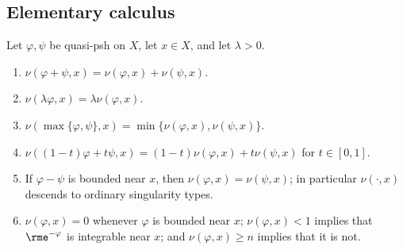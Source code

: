 \subsection{Elementary calculus}
\label{sec:ch51-lelong-calculus}

\begin{proposition}\label{prop:ch51-lelong-calculus}
Let $\varphi,\psi$ be quasi-psh on $X$, let $x\in X$, and let
$\lambda>0$.
\begin{enumerate}
\item\label{itm:ch51-lc:sum}
      $\nu(\varphi+\psi,x)=\nu(\varphi,x)+\nu(\psi,x)$.
\item\label{itm:ch51-lc:scale}
      $\nu(\lambda\varphi,x)=\lambda\nu(\varphi,x)$.
\item\label{itm:ch51-lc:max}
      $\nu(\max\{\varphi,\psi\},x)=\min\{\nu(\varphi,x),\nu(\psi,x)\}$.
\item\label{itm:ch51-lc:convex}
      $\nu((1-t)\varphi+t\psi,x)=(1-t)\nu(\varphi,x)+t\nu(\psi,x)$ for
      $t\in[0,1]$.
\item\label{itm:ch51-lc:bounded}
      If $\varphi-\psi$ is bounded near $x$, then
      $\nu(\varphi,x)=\nu(\psi,x)$; in particular $\nu(\cdot,x)$
      descends to ordinary singularity types.
\item\label{itm:ch51-lc:smooth}
      $\nu(\varphi,x)=0$ whenever $\varphi$ is bounded near $x$;
      $\nu(\varphi,x)<1$ implies that $\rme^{-\varphi}$ is integrable
      near $x$; and $\nu(\varphi,x)\geq n$ implies that it is not.
\end{enumerate}
\end{proposition}

